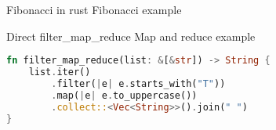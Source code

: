 
\begin{frame}{Fibonacci in rust}
    Fibonacci example


\end{frame}

\begin{frame}[fragile]{Direct filter\_map\_reduce}
    Map and reduce example

    \begin{lstlisting}[language=Rust,escapechar=@,label={lst:map_reduce-test}]
fn filter_map_reduce(list: &[&str]) -> String {
    list.iter()
        .filter(|e| e.starts_with("T"))
        .map(|e| e.to_uppercase())
        .collect::<Vec<String>>().join(" ")
}\end{lstlisting}

\end{frame}
